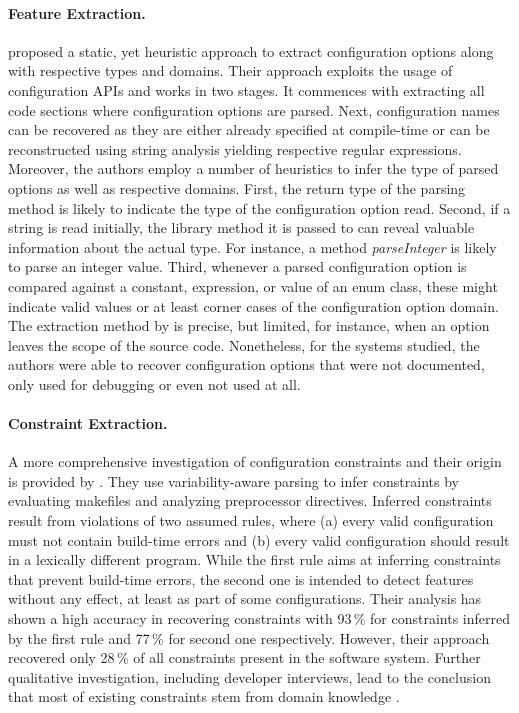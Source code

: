 \paragraph{Feature Extraction.} \cite{rabkin_static_2011} proposed a static, yet
heuristic approach to extract configuration options along with respective types and domains. Their approach
exploits the usage of configuration APIs and works
in two stages. It commences with extracting all code sections where
configuration options are parsed. Next, configuration names can be
recovered as they are either already specified at compile-time or can be
reconstructed using string analysis yielding respective regular expressions.
Moreover, the authors employ a number of heuristics to infer the type of parsed
options as well as respective domains. First, the return type of the
parsing method is likely to indicate the type of the configuration option read.
Second, if a string is read initially, the library method it is passed to can
reveal valuable information about the actual type. For instance, a method
\emph{parseInteger} is likely to parse an integer value. Third, whenever a
parsed configuration option is compared against a constant, expression, or value
of an enum class, these might indicate valid values or at least corner cases of
the configuration option domain. The extraction method by
\cite{rabkin_static_2011} is precise, but limited, for instance, when an
option leaves the scope of the source code.
Nonetheless, for the systems studied, the authors were able to recover
configuration options that were not documented, only used for debugging or even not used at
all.

\paragraph{Constraint Extraction.} 
A more comprehensive investigation of configuration
constraints and their origin is provided by \cite{nadi_mining_2014,nadi_where_2015}. They use variability-aware parsing to infer constraints by
evaluating makefiles and  analyzing preprocessor directives. Inferred
constraints result from violations of two assumed rules, where (a) every valid
configuration must not contain build-time errors and (b) every valid
configuration should result in a lexically different program. While the
first rule aims at inferring constraints that prevent build-time errors, the
second one is intended to detect features without any effect, at least as part
of some configurations. Their analysis has shown a high accuracy
in recovering constraints with 93\,\% for constraints inferred by the first rule
and 77\,\% for second one respectively. However, their approach
recovered only 28\,\% of all constraints present in the software system.
Further qualitative investigation, including developer interviews, lead to
the conclusion that most of existing constraints stem from domain knowledge
\citep{nadi_where_2015}.

